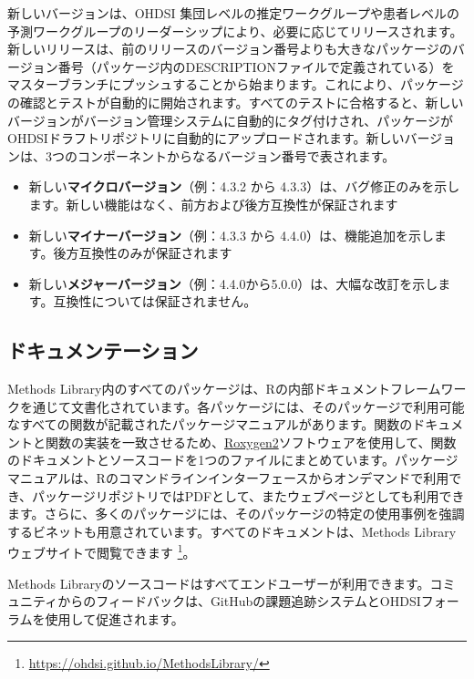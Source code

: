 \documentclass[
  11pt]{book}
\theoremstyle{definition}
\theoremstyle{definition}
\theoremstyle{definition}
\theoremstyle{definition}
\theoremstyle{remark}
\begin{document}
新しいバージョンは、OHDSI 集団レベルの推定ワークグループや患者レベルの予測ワークグループのリーダーシップにより、必要に応じてリリースされます。新しいリリースは、前のリリースのバージョン番号よりも大きなパッケージのバージョン番号（パッケージ内のDESCRIPTIONファイルで定義されている）をマスターブランチにプッシュすることから始まります。これにより、パッケージの確認とテストが自動的に開始されます。すべてのテストに合格すると、新しいバージョンがバージョン管理システムに自動的にタグ付けされ、パッケージがOHDSIドラフトリポジトリに自動的にアップロードされます。新しいバージョンは、3つのコンポーネントからなるバージョン番号で表されます。

\begin{itemize}
\item
  新しい\textbf{マイクロバージョン}（例：4.3.2 から 4.3.3）は、バグ修正のみを示します。新しい機能はなく、前方および後方互換性が保証されます
\item
  新しい\textbf{マイナーバージョン}（例：4.3.3 から 4.4.0）は、機能追加を示します。後方互換性のみが保証されます
\item
  新しい\textbf{メジャーバージョン}（例：4.4.0から5.0.0）は、大幅な改訂を示します。互換性については保証されません。
\end{itemize}

\subsection{ドキュメンテーション}\label{ux30c9ux30adux30e5ux30e1ux30f3ux30c6ux30fcux30b7ux30e7ux30f3}

Methods Library内のすべてのパッケージは、Rの内部ドキュメントフレームワークを通じて文書化されています。各パッケージには、そのパッケージで利用可能なすべての関数が記載されたパッケージマニュアルがあります。関数のドキュメントと関数の実装を一致させるため、\href{https://cran.r-project.org/web/packages/roxygen2/vignettes/roxygen2.html}{Roxygen2}ソフトウェアを使用して、関数のドキュメントとソースコードを1つのファイルにまとめています。パッケージマニュアルは、Rのコマンドラインインターフェースからオンデマンドで利用でき、パッケージリポジトリではPDFとして、またウェブページとしても利用できます。さらに、多くのパッケージには、そのパッケージの特定の使用事例を強調するビネットも用意されています。すべてのドキュメントは、Methods Libraryウェブサイトで閲覧できます \footnote{\url{https://ohdsi.github.io/MethodsLibrary/}}。

Methods Libraryのソースコードはすべてエンドユーザーが利用できます。コミュニティからのフィードバックは、GitHubの課題追跡システムとOHDSIフォーラムを使用して促進されます。
\end{document}

